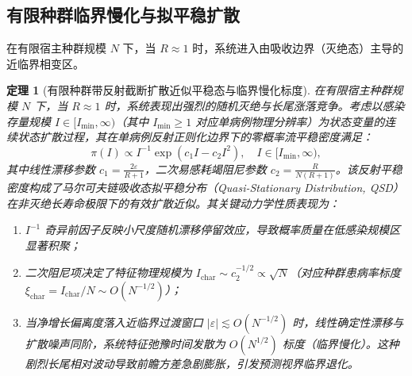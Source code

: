 \documentclass[11pt,a4paper]{article}
\theoremstyle{plain}
\newtheorem{theorem}{定理}
\theoremstyle{definition}
\begin{document}
\subsection{有限种群临界慢化与拟平稳扩散}

在有限宿主种群规模 $N$ 下，当 $R \approx 1$ 时，系统进入由吸收边界（灭绝态）主导的近临界相变区。

\begin{theorem}[有限种群带反射截断扩散近似平稳态与临界慢化标度]\label{thm:qsd}
在有限宿主种群规模 $N$ 下，当 $R \approx 1$ 时，系统表现出强烈的随机灭绝与长尾涨落竞争。考虑以感染存量规模 $I \in [I_{\min}, \infty)$（其中 $I_{\min} \ge 1$ 对应单病例物理分辨率）为状态变量的连续状态扩散过程，其在单病例反射正则化边界下的零概率流平稳密度满足：
\begin{equation}
\pi(I) \propto I^{-1} \exp(c_1 I - c_2 I^2), \quad I \in [I_{\min}, \infty),
\label{eq:qsd_density}
\end{equation}
其中线性漂移参数 $c_1 = \frac{2\varepsilon}{R+1}$，二次易感耗竭阻尼参数 $c_2 = \frac{R}{N(R+1)}$。该反射平稳密度构成了马尔可夫链吸收态拟平稳分布（Quasi-Stationary Distribution, QSD）在非灭绝长寿命极限下的有效扩散近似\citep{nasell1999quasi, dolgoarshinnykh2006critical}。其关键动力学性质表现为：
\begin{enumerate}
\item $I^{-1}$ 奇异前因子反映小尺度随机漂移停留效应，导致概率质量在低感染规模区显著积聚；
\item 二次阻尼项决定了特征物理规模为 $I_{\text{char}} \sim c_2^{-1/2} \propto \sqrt{N}$（对应种群患病率标度 $\xi_{\text{char}} = I_{\text{char}}/N \sim O(N^{-1/2})$）；
\item 当净增长偏离度落入近临界过渡窗口 $|\varepsilon| \lesssim O(N^{-1/2})$ 时，线性确定性漂移与扩散噪声同阶，系统特征弛豫时间发散为 $O(N^{1/2})$ 标度（临界慢化）。这种剧烈长尾相对波动导致前瞻方差急剧膨胀，引发预测视界临界退化。
\end{enumerate}
\end{theorem}
\end{document}
